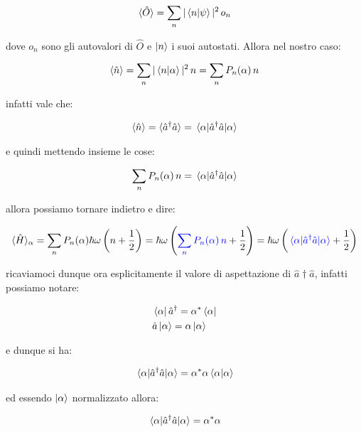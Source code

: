 \begin{align*}
	\langle \hat{O} \rangle = \sum_n |\braket{n}{\psi}|^2 \, o_n
\end{align*}

	dove $o_n$ sono gli autovalori di $\hat{O}$ e $\ket{n}$ i suoi autostati. Allora nel nostro caso:

\begin{align*}
	\langle \hat{n} \rangle = \sum_n |\braket{n}{\alpha}|^2 \, n = \sum_n P_n(\alpha) \, n 
\end{align*}

	infatti vale che:
	
\begin{align*}
	\langle \hat{n} \rangle = \langle \hat{a}^{\dagger}\hat{a} \rangle = \mel{\alpha}{\hat{a}^{\dagger}\hat{a}}{\alpha}
\end{align*}

	e quindi mettendo insieme le cose:
	
\begin{align*}
	\sum_n P_n(\alpha) \, n = \mel{\alpha}{\hat{a}^{\dagger}\hat{a}}{\alpha}
\end{align*}

	allora possiamo tornare indietro e dire:
	
\begin{align*}
	\langle \hat{H} \rangle_{\alpha} = \sum_n P_n(\alpha) \hbar \omega \, \qty(n+\frac{1}{2}) =  \hbar \omega \, \qty( \textcolor{blue}{\sum_n P_n(\alpha) \, n} +\frac{1}{2}) = \hbar \omega \, \qty( \textcolor{blue}{\mel{\alpha}{\hat{a}^{\dagger}\hat{a}}{\alpha}} +\frac{1}{2}) 
\end{align*}

	ricaviamoci dunque ora esplicitamente il valore di aspettazione di $\hat{a}{\dagger}\hat{a}$, infatti possiamo notare:
	
\begin{align*}
	& \bra{\alpha} \hat{a}^{\dagger} = \alpha^* \bra{\alpha} \\
	& \hat{a} \ket{\alpha} = \alpha \ket{\alpha}
\end{align*}

	e dunque si ha:
	
\begin{align*}
	\mel{\alpha}{\hat{a}^{\dagger}\hat{a}}{\alpha} = \alpha^* \alpha \braket{\alpha}
\end{align*}

	ed essendo $\ket{\alpha}$ normalizzato allora:
	
\begin{align*}
	\mel{\alpha}{\hat{a}^{\dagger}\hat{a}}{\alpha} = \alpha^* \alpha 
\end{align*}

